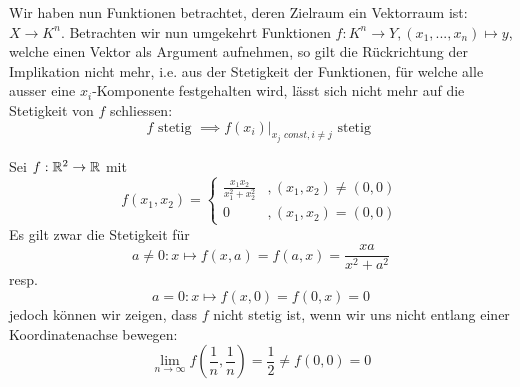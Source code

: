 \begin{remark}[Warnung] Wir haben nun Funktionen betrachtet, deren Zielraum ein Vektorraum ist: $X \to K^n$. Betrachten wir nun umgekehrt Funktionen $f: K^n \to Y, (x_1,...,x_n) \mapsto y$, welche einen Vektor als Argument aufnehmen, so gilt die Rückrichtung der Implikation nicht mehr, i.e. aus der Stetigkeit der Funktionen, für welche alle ausser eine $x_i$-Komponente festgehalten wird, lässt sich nicht mehr auf die Stetigkeit von $f$ schliessen:
$$f \text{ stetig } \implies f(x_i)\big\vert_{x_j \textit{ const}, i\neq j} \text{ stetig }$$
\begin{example}\label{ex_partiell_diffbar_gegenbsp} Sei $f: \mathbb{R}^2 \to \mathbb{R}$ mit
$$f(x_1,x_2) = \begin{cases} \frac{x_1x_2}{x_1^2+ x_2^2} & ,(x_1, x_2) \neq (0,0) \\ 0 & , (x_1, x_2) = (0,0)\end{cases}$$
Es gilt zwar die Stetigkeit für
$$a \neq 0: x \mapsto f(x,a) = f(a,x) = \frac{xa}{x^2+a^2}$$
resp.
$$a = 0: x \mapsto f(x,0) = f(0,x) = 0$$
jedoch können wir zeigen, dass $f$ nicht stetig ist, wenn wir uns nicht entlang einer Koordinatenachse bewegen:
$$\lim_{n \to \infty} f\left(\frac{1}{n}, \frac{1}{n}\right) = \frac{1}{2} \neq f(0,0) = 0$$
\begin{center}
    \centering
\end{center}


\end{example}
\end{remark}

